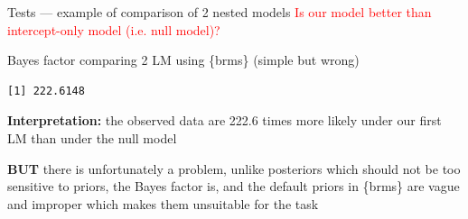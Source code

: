 \documentclass[
  10pt,
  ignorenonframetext,
  aspectratio=169,
  t]{beamer}
\newenvironment{Shaded}{\begin{snugshade}}{\end{snugshade}}
\newcommand{\AttributeTok}[1]{\textcolor[rgb]{0.40,0.45,0.13}{#1}}
\newcommand{\DecValTok}[1]{\textcolor[rgb]{0.68,0.00,0.00}{#1}}
\newcommand{\FunctionTok}[1]{\textcolor[rgb]{0.28,0.35,0.67}{#1}}
\newcommand{\NormalTok}[1]{\textcolor[rgb]{0.00,0.23,0.31}{#1}}
\newcommand{\OtherTok}[1]{\textcolor[rgb]{0.00,0.23,0.31}{#1}}
\newcommand{\SpecialCharTok}[1]{\textcolor[rgb]{0.37,0.37,0.37}{#1}}
\newcommand{\bluebold}[1]{\textcolor{bluebeamer}{\textbf{#1}}}
\begin{document}
\begin{frame}[fragile]{Tests --- example of comparison of 2 nested
models}
\protect{}\label{tests-example-of-comparison-of-2-nested-models-1}
\textcolor{red}{Is our model better than intercept-only model (i.e. null model)?}

Bayes factor comparing 2 LM using \{brms\} (simple but wrong)

\footnotesize

\begin{Shaded}
\end{Shaded}

\normalsize

\footnotesize

\normalsize

\footnotesize

\begin{verbatim}
[1] 222.6148
\end{verbatim}

\normalsize

\pause

\bluebold{Interpretation:} the observed data are 222.6 times more likely
under our first LM than under the null model

\bluebold{BUT} there is unfortunately a problem, unlike posteriors which
should not be too sensitive to priors, the Bayes factor is, and the
default priors in \{brms\} are vague and improper which makes them
unsuitable for the task
\end{frame}
\end{document}
